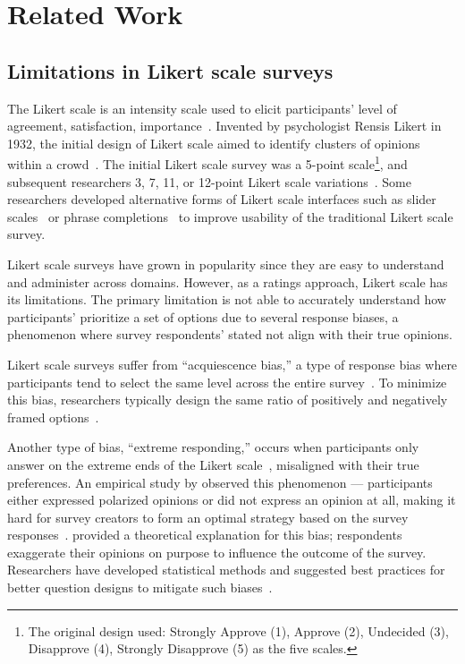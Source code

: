 \section{Related Work} \label{related_works}

\subsection{Limitations in Likert scale surveys}
The Likert scale is an intensity scale used to elicit participants' level of agreement, satisfaction, {} importance~\cite{likert1932technique}. Invented by psychologist Rensis Likert in 1932, the initial design of {} Likert scale aimed to identify clusters of opinions within a crowd~\cite{joshi2015likert}. The initial Likert scale survey was a 5-point scale\footnote{The original design used: Strongly Approve (1), Approve (2), Undecided (3), Disapprove (4), Strongly Disapprove (5) as the five scales.}, and subsequent researchers 3, 7, 11, or 12-point Likert scale variations~\cite{garland2008computer,finstad2010}. Some researchers developed alternative forms of Likert scale interfaces such as slider scales~\cite{roster2015exploring} or phrase completions~\cite{hodge2003phrase} to improve usability of the traditional Likert scale survey. 

Likert scale surveys have grown in popularity since they are easy to understand and administer across domains. However, as a ratings approach, Likert scale has its limitations. The primary limitation is not able to accurately understand how participants' prioritize a set of options due to several response biases, a phenomenon where survey respondents' stated {} not align with their true opinions. 

Likert scale surveys suffer from ``acquiescence bias,'' a type of response bias where participants tend to select the same level across the entire survey~\cite{alwin1985measurement, moors2016two}. To minimize this bias, researchers typically design the same ratio of positively and negatively framed options~\cite{kuru2016improving}. 

Another type of bias, ``extreme responding,'' occurs when participants only answer on the extreme ends of the Likert scale~\cite{batchelor2016extreme, furnham1986response, meisenberg2008acquiescent}, misaligned with their true preferences. An empirical study by \textcite{quarfoot2017quadratic} observed this phenomenon --- participants either expressed polarized opinions or did not express an opinion at all, making it hard for survey creators to form an optimal strategy based on the survey responses~\cite{posner2018radical}. \textcite{cavaille2018towards} provided a theoretical explanation for this bias; respondents exaggerate their opinions on purpose to influence the outcome of the survey. Researchers have developed statistical methods and suggested best practices for better question designs to mitigate such biases~\cite{glaser2008response}.

